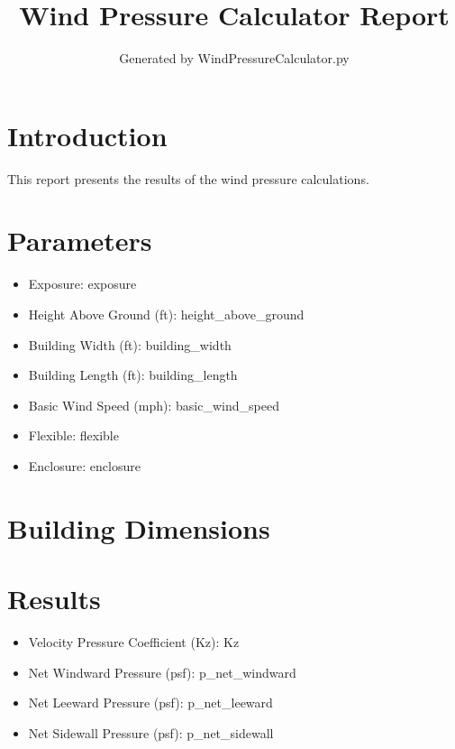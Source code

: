\documentclass{article}
\title{Wind Pressure Calculator Report}
\author{Generated by WindPressureCalculator.py}
\begin{document}
\maketitle

\section{Introduction}
This report presents the results of the wind pressure calculations.

\section{Parameters}
\begin{itemize}
    \item Exposure: {{ exposure }}
    \item Height Above Ground (ft): {{ height_above_ground }}
    \item Building Width (ft): {{ building_width }}
    \item Building Length (ft): {{ building_length }}
    \item Basic Wind Speed (mph): {{ basic_wind_speed }}
    \item Flexible: {{ flexible }}
    \item Enclosure: {{ enclosure }}
\end{itemize}

\section{Building Dimensions}

\section{Results}
\begin{itemize}
    \item Velocity Pressure Coefficient (Kz): {{ Kz }}
    \item Net Windward Pressure (psf): {{ p_net_windward }}
    \item Net Leeward Pressure (psf): {{ p_net_leeward }}
    \item Net Sidewall Pressure (psf): {{ p_net_sidewall }}
\end{itemize}
\end{document}
